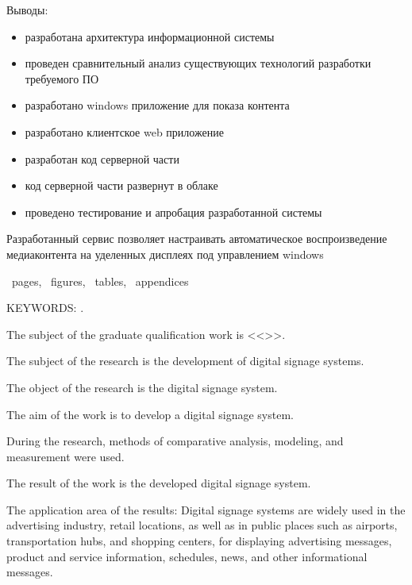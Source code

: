 Выводы:
\begin{itemize}
    \item разработана архитектура информационной системы
    \item проведен сравнительный анализ существующих технологий разработки требуемого ПО
    \item разработано windows приложение для показа контента
    \item разработано клиентское web приложение
    \item разработан код серверной части
    \item код серверной части развернут в облаке
    \item проведено тестирование и апробация разработанной системы
\end{itemize}
Разработанный сервис позволяет настраивать автоматическое воспроизведение медиаконтента на уделенных дисплеях под управлением windows

\intervalS
\intervalS
\intervalS


\printTheAbstract %


~pages, 
~figures, 
~tables,
~appendices%

{\MakeUppercase{Keywords: \keywordsEn}.} %
	
The subject of the graduate qualification work is <<\thesisTitleEn>>.
	
	
\abstractEn %

The subject of the research is the development of digital signage systems.

The object of the research is the digital signage system.

The aim of the work is to develop a digital signage system.

During the research, methods of comparative analysis, modeling, and measurement were used.

The result of the work is the developed digital signage system.

The application area of the results: Digital signage systems are widely used in the advertising industry, retail locations, as well as in public places such as airports, transportation hubs, and shopping centers, for displaying advertising messages, product and service information, schedules, news, and other informational messages.

